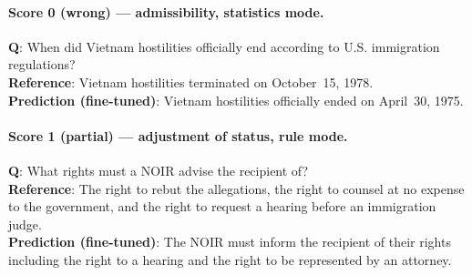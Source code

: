 \documentclass[11pt]{article}
\begin{document}
\paragraph{Score 0 (wrong) --- admissibility, statistics mode.}
\textbf{Q}: When did Vietnam hostilities officially end according to U.S. immigration regulations?\\
\textbf{Reference}: Vietnam hostilities terminated on October~15, 1978.\\
\textbf{Prediction (fine-tuned)}: Vietnam hostilities officially ended on April~30, 1975.

\paragraph{Score 1 (partial) --- adjustment of status, rule mode.}
\textbf{Q}: What rights must a NOIR advise the recipient of?\\
\textbf{Reference}: The right to rebut the allegations, the right to counsel at no expense to the government, and the right to request a hearing before an immigration judge.\\
\textbf{Prediction (fine-tuned)}: The NOIR must inform the recipient of their rights including the right to a hearing and the right to be represented by an attorney.
\end{document}
